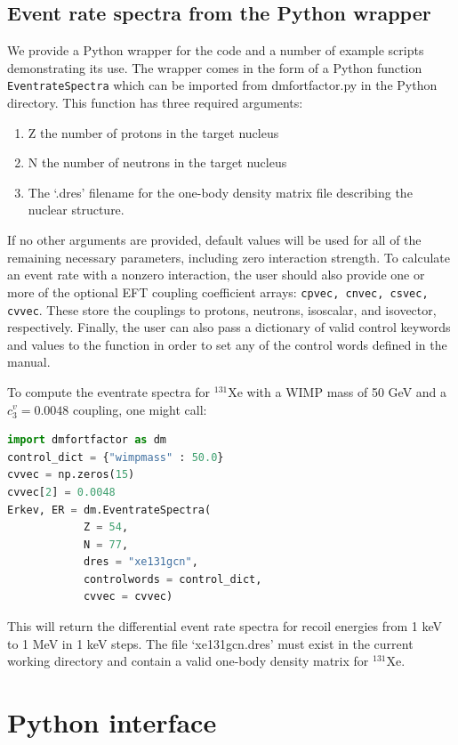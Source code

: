 \documentclass[
14pt, %
a4paper, %
oneside, %
headinclude,footinclude, %
BCOR5mm, %
]{scrartcl}
\begin{document}
\subsection{Event rate spectra from the Python wrapper}
We provide a Python wrapper for the code and a number of example scripts
demonstrating its use. The wrapper comes in the form of a Python function {\tt
EventrateSpectra} which can be imported from dmfortfactor.py in the Python
directory.  This function has three required arguments: 
\begin{enumerate}
    \item Z the number of protons in the target nucleus
    \item N the number of neutrons in the target nucleus
    \item The `.dres' filename for the one-body density matrix file describing the nuclear structure. 
\end{enumerate}
If no other arguments are provided, default values will be used for all of the
remaining necessary parameters, including zero interaction strength.  To
calculate an event rate with a nonzero interaction, the user should also provide
one or more of the optional EFT coupling coefficient arrays: {\tt cpvec, cnvec,
csvec, cvvec}. These store the couplings to protons, neutrons, isoscalar, and
isovector, respectively.  Finally, the user can also pass a dictionary of valid
control keywords and values to the function in order to set any of the control
words defined in the manual.

To compute the eventrate spectra for $^{131}$Xe with a WIMP mass of 50 GeV and a
$c_3^v=0.0048$ coupling, one might call:
\begin{lstlisting}[language=Python]
import dmfortfactor as dm
control_dict = {"wimpmass" : 50.0}
cvvec = np.zeros(15)
cvvec[2] = 0.0048 
Erkev, ER = dm.EventrateSpectra(
            Z = 54,
            N = 77,
            dres = "xe131gcn",
            controlwords = control_dict,
            cvvec = cvvec)
\end{lstlisting}
This will return the differential event rate spectra for recoil energies from 1
keV to 1 MeV in 1 keV steps. The file `xe131gcn.dres' must exist in the current
working directory and contain a valid one-body density matrix for $^{131}$Xe.


\section{Python interface}
\end{document}
